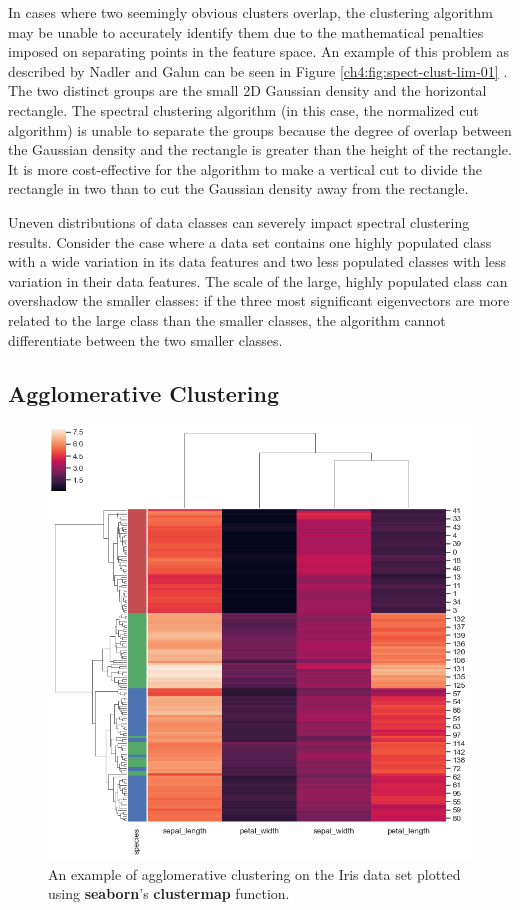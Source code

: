 In cases where two seemingly obvious clusters overlap, the clustering algorithm may be unable to accurately identify them due to the mathematical penalties imposed on separating points in the feature space. An example of this problem as described by Nadler and Galun can be seen in Figure \ref{ch4:fig:spect-clust-lim-01} \cite{Nadler2007}. The two distinct groups are the small 2D Gaussian density and the horizontal rectangle. The spectral clustering algorithm (in this case, the normalized cut algorithm) is unable to separate the groups because the degree of overlap between the Gaussian density and the rectangle is greater than the height of the rectangle. It is more cost-effective for the algorithm to make a vertical cut to divide the rectangle in two than to cut the Gaussian density away from the rectangle.

Uneven distributions of data classes can severely impact spectral clustering results. Consider the case where a data set contains one highly populated class with a wide variation in its data features and two less populated classes with less variation in their data features. The scale of the large, highly populated class can overshadow the smaller classes: if the three most significant eigenvectors are more related to the large class than the smaller classes, the algorithm cannot differentiate between the two smaller classes.

\subsection{Agglomerative Clustering}

\begin{figure}[t]
\centering
\includegraphics[width=.5\textwidth]{4/clustermap-example.png}
\caption{An example of agglomerative clustering on the Iris data set plotted using \textbf{seaborn}'s \textbf{clustermap} function.}
\label{ch4:fig:agg}
\end{figure}

